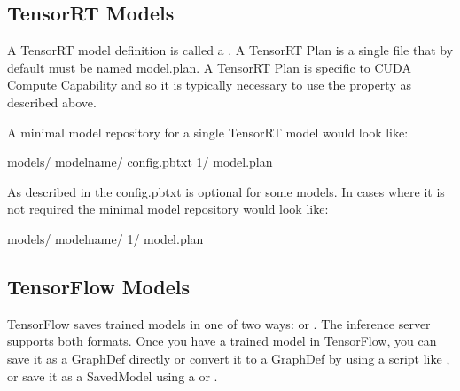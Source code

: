 \documentclass[letterpaper,10pt,english]{sphinxmanual}
\begin{document}
\subsection{TensorRT Models}
\label{\detokenize{model_repository:tensorrt-models}}\label{\detokenize{model_repository:section-tensorrt-models}}
A TensorRT model definition is called a . A TensorRT Plan is a
single file that by default must be named model.plan. A TensorRT Plan
is specific to CUDA Compute Capability and so it is typically
necessary to use the {\hyperref[\detokenize{model_configuration:section-model-configuration}]{}}  property as
described above.

A minimal model repository for a single TensorRT model would look
like:

\begin{sphinxVerbatim}[commandchars=\\\{\}]
models/
  \PYGZlt{}model\PYGZhy{}name\PYGZgt{}/
    config.pbtxt
    1/
      model.plan
\end{sphinxVerbatim}

As described in {\hyperref[\detokenize{model_configuration:section-generated-model-configuration}]{}} the
config.pbtxt is optional for some models. In cases where it is not
required the minimal model repository would look like:

\begin{sphinxVerbatim}[commandchars=\\\{\}]
models/
  \PYGZlt{}model\PYGZhy{}name\PYGZgt{}/
    1/
      model.plan
\end{sphinxVerbatim}


\subsection{TensorFlow Models}
\label{\detokenize{model_repository:tensorflow-models}}\label{\detokenize{model_repository:section-tensorflow-models}}
TensorFlow saves trained models in one of two ways:  or
. The inference server supports both formats. Once you
have a trained model in TensorFlow, you can save it as a GraphDef
directly or convert it to a GraphDef by using a script like
,
or save it as a SavedModel using a  or
.
\end{document}
